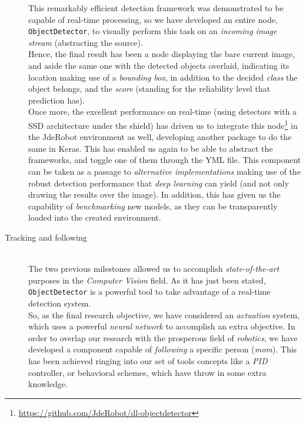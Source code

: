 \begin{description}
			This remarkably efficient detection framework was demonstrated to be capable of real-time processing, so we have developed an entire node, \texttt{ObjectDetector}, to visually perform this task on an \emph{incoming image stream} (abstracting the source).\\
			
			Hence, the final result  has been a node displaying the bare current image, and aside the same one with the detected objects overlaid, indicating its location making use of a \emph{bounding box}, in addition to the decided \emph{class} the object belongs, and the \emph{score} (standing for the reliability level that prediction has).\\
			
			Once more, the excellent performance on real-time (using detectors with a SSD architecture under the shield) has driven us to integrate this node\footnote{\url{https://github.com/JdeRobot/dl-objectdetector}} in the JdeRobot environment as well, developing another package to do the same in Keras. This has enabled us again to be able to abstract the frameworks, and toggle one of them through the YML file. This component can be taken as a passage to \emph{alternative implementations} making use of the robust detection performance that \emph{deep learning} can yield (and not only drawing the results over the image). In addition, this has given us the capability of \emph{benchmarking} new models, as they can be transparently loaded into the created environment.
			
			
		\item[Tracking and following] \hfill
			\vspace{0.2in} \\
			The two previous milestones allowed us to accomplish \emph{state-of-the-art} purposes in the \emph{Computer Vision} field. As it has just been stated, \texttt{ObjectDetector} is a powerful tool to take advantage of a real-time detection system.\\
			
			So, as the final research objective, we have considered an \emph{actuation} system, which uses a powerful \emph{neural network} to accomplish an extra objective. In order to overlap our research with the prosperous field of \emph{robotics}, we have developed a component capable of \emph{following} a specific person (\emph{mom}). This has been achieved ringing into our set of tools concepts like a \emph{PID} controller, or behavioral schemes, which have throw in some extra knowledge.\\
			

\end{description}
